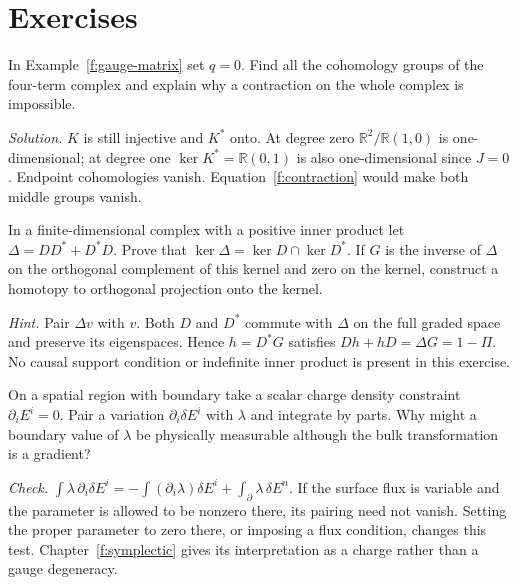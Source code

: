 \section*{Exercises}
\begin{exercise}In Example~\ref{f:gauge-matrix} set $q=0$. Find all the cohomology groups of the four-term complex and explain why a contraction on the whole complex is impossible.\end{exercise}
\noindent\emph{Solution.} $K$ is still injective and $K^*$ onto. At degree zero $\mathbb R^2/\mathbb R(1,0)$ is one-dimensional; at degree one $\ker K^*=\mathbb R(0,1)$ is also one-dimensional since $J=0$. Endpoint cohomologies vanish. Equation~\eqref{f:contraction} would make both middle groups vanish.
\begin{exercise}In a finite-dimensional complex with a positive inner product let $\Delta=DD^*+D^*D$. Prove that $\ker\Delta=\ker D\cap\ker D^*$. If $G$ is the inverse of $\Delta$ on the orthogonal complement of this kernel and zero on the kernel, construct a homotopy to orthogonal projection onto the kernel.\end{exercise}
\noindent\emph{Hint.} Pair $\Delta v$ with $v$. Both $D$ and $D^*$ commute with $\Delta$ on the full graded space and preserve its eigenspaces. Hence $h=D^*G$ satisfies $Dh+hD=\Delta G=1-\Pi$. No causal support condition or indefinite inner product is present in this exercise.
\begin{exercise}\label{f:gauge-boundary-ex}On a spatial region with boundary take a scalar charge density constraint $\partial_iE^i=0$. Pair a variation $\partial_i\delta E^i$ with $\lambda$ and integrate by parts. Why might a boundary value of $\lambda$ be physically measurable although the bulk transformation is a gradient?\end{exercise}
\noindent\emph{Check.} $\int\lambda\,\partial_i\delta E^i=-\int (\partial_i\lambda)\delta E^i+\int_{\partial}\lambda\,\delta E^n$. If the surface flux is variable and the parameter is allowed to be nonzero there, its pairing need not vanish. Setting the proper parameter to zero there, or imposing a flux condition, changes this test. Chapter~\ref{f:symplectic} gives its interpretation as a charge rather than a gauge degeneracy.
